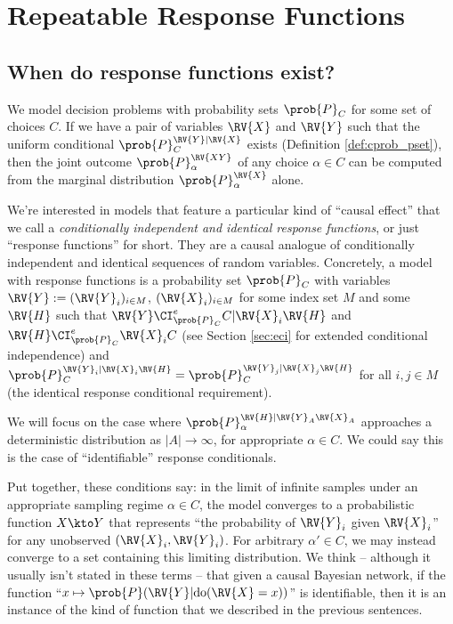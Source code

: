 
\chapter{Repeatable Response Functions}\label{ch:evaluating_decisions}

\section{When do response functions exist?}\label{sec:response_functions}

We model decision problems with probability sets $\prob{P}_C$ for some set of choices $C$. If we have a pair of variables $\RV{X}$ and $\RV{Y}$ such that the uniform conditional $\prob{P}_C^{\RV{Y}|\RV{X}}$ exists (Definition \ref{def:cprob_pset}), then the joint outcome $\prob{P}_\alpha^{\RV{XY}}$ of any choice $\alpha\in C$ can be computed from the marginal distribution $\prob{P}_\alpha^{\RV{X}}$ alone.

We're interested in models that feature a particular kind of ``causal effect'' that we call a \emph{conditionally independent and identical response functions}, or just ``response functions'' for short. They are a causal analogue of conditionally independent and identical sequences of random variables. Concretely, a model with response functions is a probability set $\prob{P}_C$ with variables $\RV{Y}:=(\RV{Y}_i)_{i\in M}$, $(\RV{X}_i)_{i\in M}$ for some index set $M$ and some $\RV{H}$ such that $\RV{Y} \CI_{\prob{P}_C}^e C|\RV{X}_i\RV{H}$ and $\RV{H}\CI_{\prob{P}_C}^e \RV{X}_i C$ (see Section \ref{sec:eci} for extended conditional independence) and $\prob{P}_C^{\RV{Y}_i|\RV{X}_i\RV{H}}=\prob{P}_C^{\RV{Y}_j|\RV{X}_j\RV{H}}$ for all $i,j\in M$ (the identical response conditional requirement).

We will focus on the case where $\prob{P}_\alpha^{\RV{H}|\RV{Y}_A\RV{X}_A}$ approaches a deterministic distribution as $|A|\to \infty$, for appropriate $\alpha\in C$. We could say this is the case of ``identifiable'' response conditionals.

Put together, these conditions say: in the limit of infinite samples under an appropriate sampling regime $\alpha\in C$, the model converges to a probabilistic function $X\kto Y$ that represents ``the probability of $\RV{Y}_i$ given $\RV{X}_i$'' for any unobserved $(\RV{X}_i,\RV{Y}_i)$. For arbitrary $\alpha'\in C$, we may instead converge to a set containing this limiting distribution. We think -- although it usually isn't stated in these terms -- that given a causal Bayesian network, if the function ``$x\mapsto \prob{P}(\RV{Y}|\mathrm{do}(\RV{X}=x))$'' is identifiable, then it is an instance of the kind of function that we described in the previous sentences.

